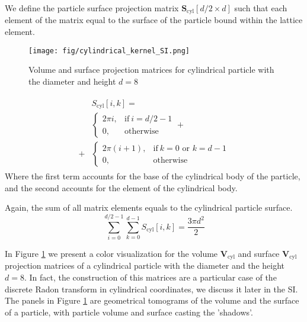 \documentclass[10pt, a4paper]{article}
\begin{document}
\begin{multicols}{2}
We define the particle surface projection matrix  $\mathbf{S}_{\textrm{cyl}}[d/2 \times d]$ such that each element of the matrix equal to the surface of the particle bound within the lattice element.

\begin{figure}[H]
    \centering
    \texttt{[image: fig/cylindrical\_kernel\_SI.png]}
    \caption{Volume and surface projection matrices for cylindrical particle with the diameter and height $d=8$}
    \label{fig:cylindrical_kernel_SI}
\end{figure}

\begin{align}
    \begin{split}
        &S_{\textrm{cyl}}[i,k] = 
        \\
        &\begin{cases}
            2 \pi i,   & \text{if}\ i=d/2-1 \\
            0,         & \text{otherwise}
        \end{cases}
    +
    \\
    +
    &\begin{cases}
        2\pi(i+1), & \text{if}\ k=0 \text{ or } k=d-1 \\
        0,         & \text{otherwise}
    \end{cases}
\end{split}
\end{align}
Where the first term accounts for the base of the cylindrical body of the particle, and the second accounts for the element of the cylindrical body.

Again, the sum of all matrix elements equals to the cylindrical particle surface.
\begin{equation}
    \sum_{i=0}^{d/2-1} \sum_{k=0}^{d-1} S_{\textrm{cyl}}[i, k] = \frac{3 \pi d^2}{2}
\end{equation}

In Figure \ref{fig:cylindrical_kernel_SI} we present a color visualization for the volume $\mathbf{V}_{\textrm{cyl}}$ and surface $\mathbf{V}_{\textrm{cyl}}$ projection matrices of a cylindrical particle with the diameter and the height $d=8$.
In fact, the construction of this matrices are a particular case of the discrete Radon transform in cylindrical coordinates, we discuss it later in the SI.
The panels in Figure \ref{fig:cylindrical_kernel_SI} are geometrical tomograms of the volume and the surface of a particle, with particle volume and surface casting the 'shadows'.


\end{multicols}
\end{document}

